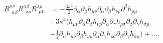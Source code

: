 \begin{equation}\begin{split}
R^{\mu\nu}_{\ \ \alpha\beta}R^{\alpha\beta}_{\ \ \lambda\rho}R^{\lambda\rho}_{\ \ \mu\nu} &=
-\frac{3\kappa^3}2\partial_\alpha\partial_\beta h_{\mu\nu} \partial_\alpha\partial_\beta h_{\nu\rho}\partial^2 h_{\rho\mu}
\\&+3\kappa^4(h_{\mu\nu}\partial_\alpha\partial_\beta h_{\nu\rho} \partial_\alpha\partial_\gamma h_{\rho\sigma} \partial_\beta\partial_\gamma h_{\sigma\mu}
\\&+\frac{1}2\partial_\alpha h_{\mu\nu}\partial_\beta h_{\nu\rho} \partial_\alpha\partial_\gamma h_{\rho\sigma}
\partial_\beta\partial_\gamma h_{\sigma\mu})+\ldots,
\end{split}\end{equation}

